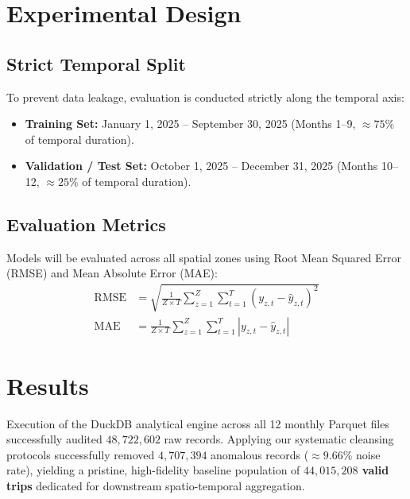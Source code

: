 \documentclass[11pt,a4paper]{article}
\begin{document}
\section{Experimental Design}

\subsection{Strict Temporal Split}
To prevent data leakage, evaluation is conducted strictly along the temporal axis:
\begin{itemize}
    \item \textbf{Training Set:} January 1, 2025 -- September 30, 2025 (Months 1--9, $\approx 75\%$ of temporal duration).
    \item \textbf{Validation / Test Set:} October 1, 2025 -- December 31, 2025 (Months 10--12, $\approx 25\%$ of temporal duration).
\end{itemize}

\subsection{Evaluation Metrics}
Models will be evaluated across all spatial zones using Root Mean Squared Error (RMSE) and Mean Absolute Error (MAE):
\begin{align}
\text{RMSE} &= \sqrt{\frac{1}{Z \times T} \sum_{z=1}^{Z} \sum_{t=1}^{T} \left( y_{z,t} - \hat{y}_{z,t} \right)^2} \\
\text{MAE} &= \frac{1}{Z \times T} \sum_{z=1}^{Z} \sum_{t=1}^{T} \left| y_{z,t} - \hat{y}_{z,t} \right|
\end{align}

\section{Results}
Execution of the DuckDB analytical engine across all 12 monthly Parquet files successfully audited $48,722,602$ raw records. Applying our systematic cleansing protocols successfully removed $4,707,394$ anomalous records ($\approx 9.66\%$ noise rate), yielding a pristine, high-fidelity baseline population of \textbf{$44,015,208$ valid trips} dedicated for downstream spatio-temporal aggregation.
\end{document}
